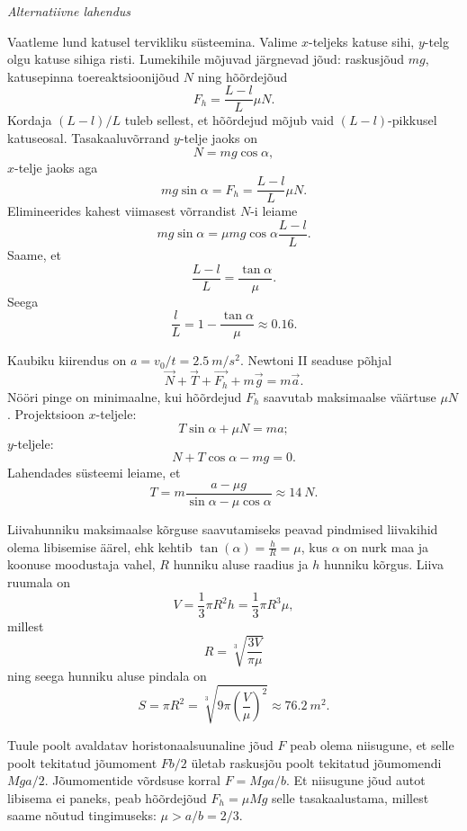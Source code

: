 \documentclass[10pt]{article}
\begin{document}
{\vspace{0.5\baselineskip}

\emph{Alternatiivne lahendus}

Vaatleme lund katusel tervikliku süsteemina. Valime $x$-teljeks katuse sihi, $y$-telg olgu katuse sihiga risti. Lumekihile mõjuvad järgnevad jõud: raskusjõud $mg$, katusepinna toereaktsioonijõud $N$ ning hõõrdejõud
\[
F_h = \frac{L-l}{L} \mu N.
\]
Kordaja $(L-l)/L$ tuleb sellest, et hõõrdejud mõjub vaid $(L-l)$-pikkusel katuseosal.
Tasakaaluvõrrand $y$-telje jaoks on
\[
N = mg \cos \alpha,
\]
$x$-telje jaoks aga
\[
m g \sin \alpha=F_{h}=\frac{L-l}{L} \mu N.
\]
Elimineerides kahest viimasest võrrandist $N$-i leiame
\[
m g \sin \alpha=\mu m g \cos \alpha \frac{L-l}{L}.
\]
Saame, et
\[
\frac{L-l}{L} = \frac{\tan\alpha}{\mu}.
\]
Seega
\[
\frac{l}{L}=1-\frac{\tan \alpha}{\mu} \approx \num{0,16}.
\]
\probend
\bigskip


\solu
Kaubiku kiirendus on $a=v_0/t=\SI{2.5}{m/s^2}$. Newtoni II seaduse põhjal
\[
\vec{N}+\vec{T}+\vec{F_h}+m\vec{g}=m\vec{a}.
\]
Nööri pinge on minimaalne, kui hõõrdejud $F_h$ saavutab maksimaalse väärtuse $\mu N$. Projektsioon $x$-teljele:
\[
T\sin\alpha+\mu N=ma;
\]
$y$-teljele:
\[
N+T\cos\alpha-mg=0.
\]
Lahendades süsteemi leiame, et
\[
T=m\frac{a-\mu g}{\sin\alpha-\mu\cos\alpha} \approx \SI{14}{N}.
\]
\probend
\bigskip


\solu
Liivahunniku maksimaalse kõrguse saavutamiseks peavad pindmised liivakihid olema libisemise äärel, ehk kehtib $\tan (\alpha)=\frac{h}{R}=\mu$, kus $\alpha$ on nurk maa ja koonuse moodustaja vahel, $R$ hunniku aluse raadius ja $h$ hunniku kõrgus. Liiva ruumala on
\[
V=\frac{1}{3} \pi R^{2} h=\frac{1}{3} \pi R^{3} \mu,
\]
millest 
\[
R=\sqrt[3]{\frac{3 V}{\pi \mu}}
\]
ning seega hunniku aluse pindala on
\[
S=\pi R^{2}=\sqrt[3]{9 \pi\left(\frac{V}{\mu}\right)^{2}} \approx \SI{76.2}{m^2}.
\]
\probend
\bigskip


\solu
Tuule poolt avaldatav horistonaalsuunaline jõud $F$ peab olema niisugune, et selle poolt tekitatud jõumoment $Fb/2$ ületab raskusjõu poolt tekitatud jõumomendi $Mga/2$. Jõumomentide võrdsuse korral $F=Mga/b$. Et niisugune jõud autot libisema ei paneks, peab hõõrdejõud $F_h=\mu Mg$ selle tasakaalustama, millest saame nõutud tingimuseks: $\mu > a/b = 2/3$.
\probend
\bigskip

}
\end{document}
